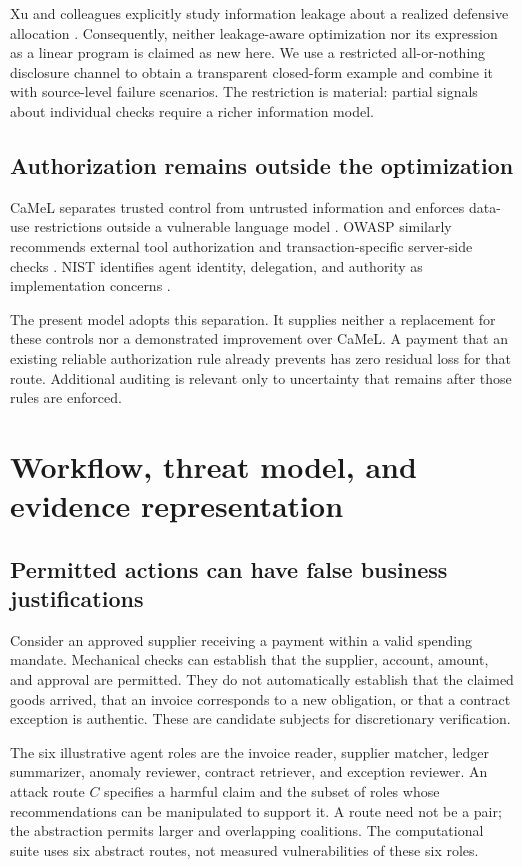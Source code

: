 \documentclass[11pt,letterpaper]{article}
\begin{document}
Xu and colleagues explicitly study information leakage about a realized defensive allocation \cite{leakage2015}. Consequently, neither leakage-aware optimization nor its expression as a linear program is claimed as new here. We use a restricted all-or-nothing disclosure channel to obtain a transparent closed-form example and combine it with source-level failure scenarios. The restriction is material: partial signals about individual checks require a richer information model.

\subsection{Authorization remains outside the optimization}

CaMeL separates trusted control from untrusted information and enforces data-use restrictions outside a vulnerable language model \cite{camel}. OWASP similarly recommends external tool authorization and transaction-specific server-side checks \cite{owaspagent,owasptransaction}. NIST identifies agent identity, delegation, and authority as implementation concerns \cite{nist2026}.

The present model adopts this separation. It supplies neither a replacement for these controls nor a demonstrated improvement over CaMeL. A payment that an existing reliable authorization rule already prevents has zero residual loss for that route. Additional auditing is relevant only to uncertainty that remains after those rules are enforced.

\section{Workflow, threat model, and evidence representation}

\subsection{Permitted actions can have false business justifications}

Consider an approved supplier receiving a payment within a valid spending mandate. Mechanical checks can establish that the supplier, account, amount, and approval are permitted. They do not automatically establish that the claimed goods arrived, that an invoice corresponds to a new obligation, or that a contract exception is authentic. These are candidate subjects for discretionary verification.

The six illustrative agent roles are the invoice reader, supplier matcher, ledger summarizer, anomaly reviewer, contract retriever, and exception reviewer. An attack route $C$ specifies a harmful claim and the subset of roles whose recommendations can be manipulated to support it. A route need not be a pair; the abstraction permits larger and overlapping coalitions. The computational suite uses six abstract routes, not measured vulnerabilities of these six roles.
\end{document}
